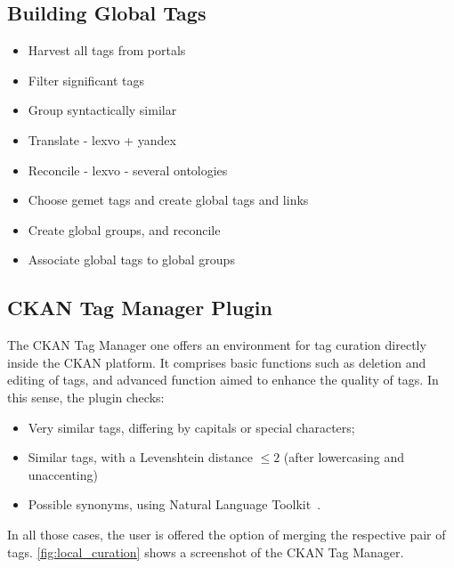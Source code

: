 \subsection{Building Global Tags}

\begin{itemize}
	\item Harvest all tags from portals
	\item Filter significant tags
	\item Group syntactically similar
	\item Translate - lexvo + yandex
	\item Reconcile - lexvo - several ontologies
	\item Choose gemet tags and create global tags and links
	\item Create global groups, and reconcile
	\item Associate global tags to global groups

	
\end{itemize}

\subsection{CKAN Tag Manager Plugin}

The CKAN Tag Manager one offers an environment for tag curation directly inside the CKAN platform. 
It comprises basic functions such as deletion and editing of tags, and advanced function aimed to enhance the quality of tags.
In this sense, the plugin checks:
\begin{itemize}
	\item Very similar tags, differing by capitals or special characters;
	\item Similar tags, with a Levenshtein distance $\le 2$ (after lowercasing and unaccenting)
	\item Possible synonyms, using Natural Language Toolkit~\cite{Bird2009}.
\end{itemize}
In all those cases, the user is offered the option of merging the respective pair of tags. 
\autoref{fig:local_curation} shows a screenshot of the CKAN Tag Manager.

